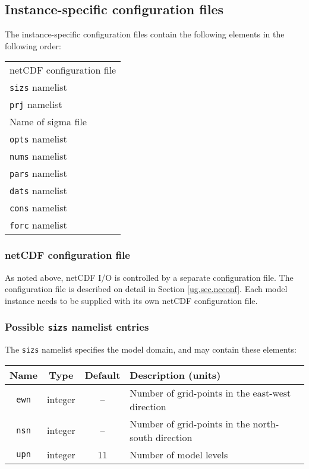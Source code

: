 \subsection{Instance-specific configuration files}
%
The instance-specific configuration files contain the following elements in
the following order:
\begin{center}
\begin{tabular}{l}
netCDF configuration file \\
\texttt{sizs} namelist \\
\texttt{prj} namelist \\
Name of sigma file \\
\texttt{opts} namelist \\
\texttt{nums} namelist \\
\texttt{pars} namelist \\
\texttt{dats} namelist \\
\texttt{cons} namelist \\
\texttt{forc} namelist \\
\end{tabular}
\end{center}
%
\subsubsection{netCDF configuration file}
%
As noted above, netCDF I/O is controlled by a separate configuration file. The configuration file is described on detail in Section \ref{ug.sec.ncconf}. Each model instance needs to be supplied with its own netCDF configuration file.
%
\subsubsection{Possible \texttt{sizs} namelist entries}
%
The \texttt{sizs} namelist specifies the model domain,
and may contain these elements:
%
\begin{center}
\begin{tabular}{|c|c|c|l|}
\hline
Name & Type & Default & Description (units) \\
\hline
\hline
\texttt{ewn} & integer & -- & Number of grid-points in the east-west
direction \\
\texttt{nsn} & integer & -- & Number of grid-points in the north-south
direction \\
\texttt{upn} & integer & 11 & Number of model levels \\
\hline
\end{tabular}
\end{center}
%

